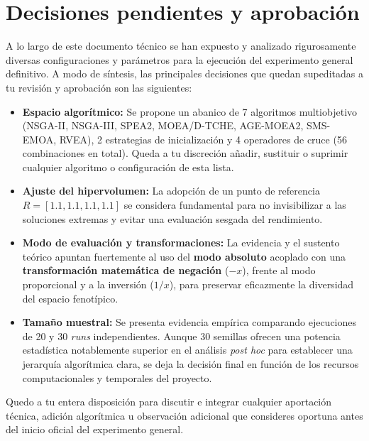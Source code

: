 \documentclass[a4paper,10pt]{article}
\begin{document}
\clearpage
\section{Decisiones pendientes y aprobación}

A lo largo de este documento técnico se han expuesto y analizado rigurosamente diversas configuraciones y parámetros para la ejecución del experimento general definitivo. A modo de síntesis, las principales decisiones que quedan supeditadas a tu revisión y aprobación son las siguientes:

\begin{itemize}
    \item \textbf{Espacio algorítmico:} Se propone un abanico de 7 algoritmos multiobjetivo (NSGA-II, NSGA-III, SPEA2, MOEA/D-TCHE, AGE-MOEA2, SMS-EMOA, RVEA), 2 estrategias de inicialización y 4 operadores de cruce (56 combinaciones en total). Queda a tu discreción añadir, sustituir o suprimir cualquier algoritmo o configuración de esta lista.
    \item \textbf{Ajuste del hipervolumen:} La adopción de un punto de referencia $R = [1.1, 1.1, 1.1, 1.1]$ se considera fundamental para no invisibilizar a las soluciones extremas y evitar una evaluación sesgada del rendimiento.
    \item \textbf{Modo de evaluación y transformaciones:} La evidencia y el sustento teórico apuntan fuertemente al uso del \textbf{modo absoluto} acoplado con una \textbf{transformación matemática de negación} ($-x$), frente al modo proporcional y a la inversión ($1/x$), para preservar eficazmente la diversidad del espacio fenotípico.
    \item \textbf{Tamaño muestral:} Se presenta evidencia empírica comparando ejecuciones de 20 y 30 \textit{runs} independientes. Aunque 30 semillas ofrecen una potencia estadística notablemente superior en el análisis \textit{post hoc} para establecer una jerarquía algorítmica clara, se deja la decisión final en función de los recursos computacionales y temporales del proyecto.
\end{itemize}

Quedo a tu entera disposición para discutir e integrar cualquier aportación técnica, adición algorítmica u observación adicional que consideres oportuna antes del inicio oficial del experimento general.
\end{document}
